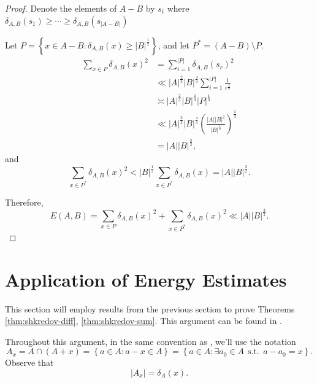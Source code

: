 \documentclass[12pt,reqno]{amsart}
\begin{document}
\begin{proof}
Denote the elements of \(A-B\) by \(s_{i} \) where \(\delta_{A,B} (s_1) \geq \cdots \geq \delta_{A,B} (s _{\left\lvert A-B \right\rvert } )\)

Let \(P = \left\{ x \in A - B : \delta_{A,B} (x) \geq \left\lvert B \right\rvert ^{\frac{1}{2} } \right\} \), and let \(P ^{*} = \left( A - B \right) \setminus P\).
\begin{align*}
    \sum _{x \in P} \delta_{A,B} (x)^{2} & =  \sum_{i=1}^{\left\lvert P \right\rvert } \delta_{A,B} (s _{r} )^{2}\\
    & \ll \left\lvert A \right\rvert ^{\frac{2}{3} } \left\lvert B \right\rvert ^{\frac{4}{3} } \sum_{i=1}^{\left\lvert P \right\rvert } \frac{1}{r^{\frac{2}{3} }} \\
    & \asymp \left\lvert A \right\rvert ^{\frac{2}{3} } \left\lvert B \right\rvert ^{\frac{4}{3} } \left\lvert P \right\rvert ^{\frac{1}{3} }\\
    & \ll \left\lvert A \right\rvert ^{\frac{2}{3} } \left\lvert B \right\rvert ^{\frac{4}{3} } \left( \frac{\left\lvert A \right\rvert \left\lvert B \right\rvert ^{2}}{\left\lvert B \right\rvert ^{\frac{1}{2} }}  \right) ^{\frac{1}{3} }\\
    & = \left\lvert A \right\rvert \left\lvert B \right\rvert ^{\frac{3}{2} },
\end{align*}
and
\[
    \sum _{x \in P^{*}} \delta_{A,B} (x)^{2} < \left\lvert B \right\rvert ^{\frac{1}{2} } \sum _{x \in P^{*}} \delta_{A,B} (x) = \left\lvert A \right\rvert \left\lvert B \right\rvert ^{\frac{3}{2} }
.\]

Therefore,
\[
    E(A,B) = \sum _{x \in P} \delta_{A,B} (x)^{2} + \sum _{x \in P ^{*}} \delta_{A,B} (x)^{2} \ll \left\lvert A \right\rvert \left\lvert B \right\rvert ^{\frac{3}{2} } 
.\]
\end{proof}

\section{ Application of Energy Estimates}
This section will employ results from the previous section to prove Theorems \ref{thm:shkredov-diff}, \ref{thm:shkredov-sum}.
This argument can be found in \cite{shkredov}.

Throughout this argument, in the same convention as \cite{shkredov}, we'll use the
notation
\[
    A_{x} = A \cap \left( A + x \right) = \left\{ a \in A : a - x \in A \right\} = \left\{ a \in A : \exists a_0 \in A ~~\text{s.t.}~~ a - a_0 = x \right\} 
.\]
Observe that
\[
    \left\lvert A_{x}  \right\rvert = \delta_{A} (x) 
.\]
\end{document}
